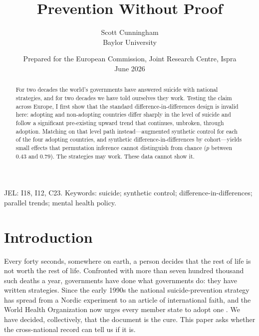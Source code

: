 \documentclass[12pt]{article}
\title{\bf Prevention Without Proof}
\author{Scott Cunningham\\ \small Baylor University}
\date{\small Prepared for the European Commission, Joint Research Centre, Ispra \\ \small June 2026}
\begin{document}
\maketitle
\thispagestyle{empty}

\begin{abstract}
\noindent
For two decades the world's governments have answered suicide with national strategies, and for
two decades we have told ourselves they work. Testing the claim across Europe, I first show that the
standard difference-in-differences design is invalid here: adopting and non-adopting countries
differ sharply in the level of suicide and follow a significant pre-existing upward trend that
continues, unbroken, through adoption. Matching on that level path instead---augmented synthetic
control for each of the four adopting countries, and synthetic difference-in-differences by
cohort---yields small effects that permutation inference cannot distinguish from chance ($p$ between
$0.43$ and $0.79$). The strategies may work. These data cannot show it.
\end{abstract}

\vfill
\begin{center}
\small JEL: I18, I12, C23. \quad Keywords: suicide; synthetic control; difference-in-differences;
parallel trends; mental health policy.
\end{center}
\clearpage

\doublespacing
\setcounter{page}{1}

\section{Introduction}

Every forty seconds, somewhere on earth, a person decides that the rest of life is not worth the
rest of life. Confronted with more than seven hundred thousand such deaths a year, governments have
done what governments do: they have written strategies. Since the early 1990s the national
suicide-prevention strategy has spread from a Nordic experiment to an article of international
faith, and the World Health Organization now urges every member state to adopt one
\citep{who2014preventing,who2018strategies}. We have decided, collectively, that the document is the
cure. This paper asks whether the cross-national record can tell us if it is.
\end{document}
